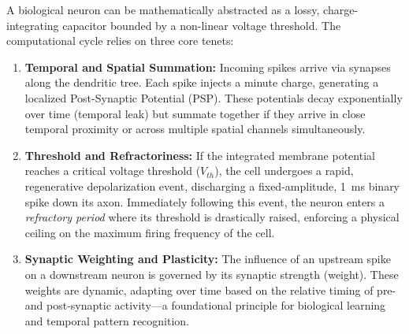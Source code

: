 A biological neuron can be mathematically abstracted as a lossy, charge-integrating capacitor bounded by a non-linear voltage threshold. The computational cycle relies on three core tenets:
\begin{enumerate}
    \item \textbf{Temporal and Spatial Summation:} Incoming spikes arrive via synapses along the dendritic tree. Each spike injects a minute charge, generating a localized Post-Synaptic Potential (PSP). These potentials decay exponentially over time (temporal leak) but summate together if they arrive in close temporal proximity or across multiple spatial channels simultaneously.
    \item \textbf{Threshold and Refractoriness:} If the integrated membrane potential reaches a critical voltage threshold ($V_{th}$), the cell undergoes a rapid, regenerative depolarization event, discharging a fixed-amplitude, 1~ms binary spike down its axon. Immediately following this event, the neuron enters a \textit{refractory period} where its threshold is drastically raised, enforcing a physical ceiling on the maximum firing frequency of the cell.
    \item \textbf{Synaptic Weighting and Plasticity:} The influence of an upstream spike on a downstream neuron is governed by its synaptic strength (weight). These weights are dynamic, adapting over time based on the relative timing of pre- and post-synaptic activity---a foundational principle for biological learning and temporal pattern recognition.
\end{enumerate}

